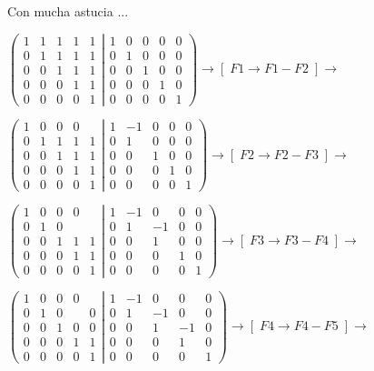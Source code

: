 \begin{proofw}\renewcommand{\qedsymbol}{$\diamond$} Con mucha astucia ...
	
	\noindent $\left( \begin{array}{ccccc}
 1&1&1&1&1\\0&1&1&1&1\\0&0&1&1&1\\0&0&0&1&1\\0&0&0&0&1	
 \end{array} \right. \left| \begin{array}{ccccc}
 1&0&0&0&0\\0&1&0&0&0\\0&0&1&0&0\\0&0&0&1&0\\0&0&0&0&1	
 \end{array} \right) \to [\; F1\to F1-F2 \;] \to $
 
 \noindent $\left( \begin{array}{ccccc}
 1&0&0&0&\\0&1&1&1&1\\0&0&1&1&1\\0&0&0&1&1\\0&0&0&0&1	
 \end{array} \right. \left| \begin{array}{ccccc}
 1&-1&0&0&0\\0&1&0&0&0\\0&0&1&0&0\\0&0&0&1&0\\0&0&0&0&1	
 \end{array} \right) \to [\; F2\to F2-F3 \;] \to $
 
  \noindent $\left( \begin{array}{ccccc}
 1&0&0&0&\\0&1&0&&\\0&0&1&1&1\\0&0&0&1&1\\0&0&0&0&1	
 \end{array} \right. \left| \begin{array}{ccccc}
 1&-1&0&0&0\\0&1&-1&0&0\\0&0&1&0&0\\0&0&0&1&0\\0&0&0&0&1	
 \end{array} \right) \to [\; F3\to F3-F4 \;] \to $
 
   \noindent $\left( \begin{array}{ccccc}
 1&0&0&0&\\0&1&0&&0\\0&0&1&0&0\\0&0&0&1&1\\0&0&0&0&1	
 \end{array} \right. \left| \begin{array}{ccccc}
 1&-1&0&0&0\\0&1&-1&0&0\\0&0&1&-1&0\\0&0&0&1&0\\0&0&0&0&1	
 \end{array} \right) \to [\; F4\to F4-F5 \;] \to $
 

\end{proofw}
